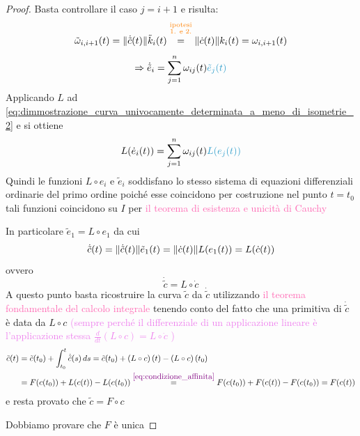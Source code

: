 \begin{proof}
        Basta controllare il caso $j=i+1$ e risulta:
        \[ \tilde{\omega}_{i,i+1} (t) = \lVert\dot{\tilde{c}}(t)\rVert \tilde{k}_i(t) \overset{\textcolor{orange}{ \substack{\text{ipotesi} \\ \text{1. e 2.} \\ \text{ }}}}{=} \lVert\dot{c}(t)\rVert k_i(t) = \omega_{i,i+1} (t)  \] 
        \begin{equation}
        \label{eq:dimmostrazione_curva_univocamente_determinata_a_meno_di_isometrie_3}
        \Rightarrow  \dot{\tilde{e}}_i = \sum_{j=1}^{n} \omega_{ij} (t)  \textcolor{celeste}{\tilde{e}_j(t)}  
        \end{equation}
        Applicando $L$ ad \eqref{eq:dimmostrazione_curva_univocamente_determinata_a_meno_di_isometrie_2} e si ottiene
        \[ L(\dot{e}_i (t) ) =  \sum_{j=1}^{n} \omega_{ij} (t) \textcolor{celeste}{L(e_j(t))}  \]
        Quindi le funzioni \textcolor{celeste}{$L \circ e_i$} e \textcolor{celeste}{$\tilde{e}_i$} soddisfano lo stesso sistema di equazioni differenziali ordinarie del primo ordine poiché
        esse coincidono per costruzione nel punto $t=t_0$ tali funzioni coincidono su $I$ per \textcolor{hotpink}{il teorema di esistenza e unicità di Cauchy}

        In particolare $\tilde{e}_1 = L \circ e_1$ da cui 
        \[ \dot{\tilde{c}}(t) = \lVert\dot{\tilde{c}}(t)\rVert \tilde{e}_1(t) = \lVert\dot{c}(t)\rVert L(e_1(t)) = L(\dot{c}(t)) \]
        ovvero
        \[ \dot{\tilde{c}}=L \circ \dot{c} \]
        A questo punto basta ricostruire la curva $\tilde{c}$ da $\dot{\tilde{c}}$ utilizzando 
        \textcolor{hotpink}{il teorema fondamentale del calcolo integrale}
        tenendo conto del fatto che una primitiva di $\dot{\tilde{c}}$ è data da $L \circ c$ \textcolor{violet}{(sempre perché il differenziale di 
        un applicazione lineare è l'applicazione stessa $\frac{d}{dt} (L \circ c) = L \circ \dot{c}$ )}
        \begin{align*}
        \tilde{c}(t) &= \tilde{c}(t_0) + \int_{t_0}^{t} \dot{\tilde{c}}(s) \, ds = \tilde{c}(t_0) + \left( L \circ c \right)(t) - \left( L \circ c \right)(t_0) \\
        &= F(c(t_0)) + L(c(t)) - L(c(t_0)) \overset{\textcolor{violet}{\eqref{eq:condizione_affinita}}}{=} F(c(t_0)) + F(c(t)) - F(c(t_0)) = F(c(t))
        \end{align*}
        e resta provato che $\tilde{c} = F \circ c$

        Dobbiamo provare che $F$ è unica 


\end{proof}
